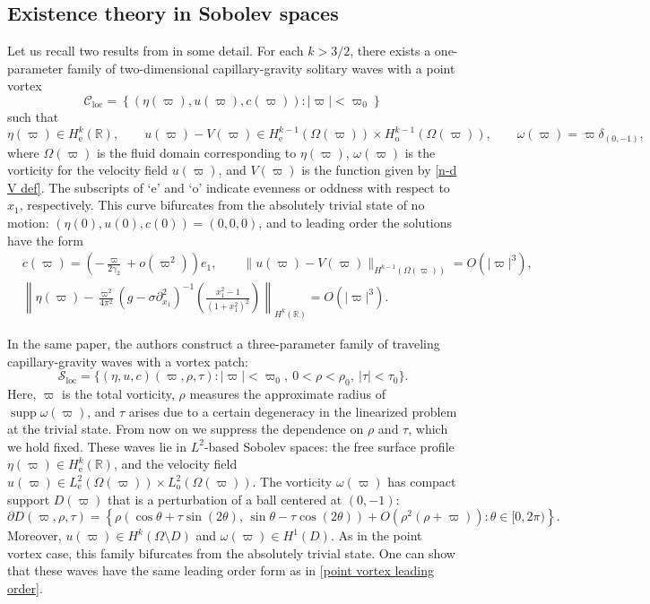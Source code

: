 \documentclass[11pt,reqno]{amsart}
\newcommand{\supp}[1]{\operatorname{supp}{#1}}
\newcommand{\R}{\mathbb{R}}
\theoremstyle{plain}
\theoremstyle{remark}
\numberwithin{equation}{section}
\begin{document}
\subsection{Existence theory in Sobolev spaces}\label{sec sobolev}
Let us recall two results from \cite{shatah2013travelling} in some detail.  For each $k > 3/2$, there exists a one-parameter family of two-dimensional capillary-gravity solitary waves with a point vortex 
\[ \mathscr{C}_{\mathrm{loc}} = \left \{ (\eta(\varpi), u(\varpi), c(\varpi)) : |\varpi| < \varpi_0  \right\} \]
such that 
\[ \eta(\varpi) \in H_{\mathrm{e}}^k(\R),\qquad u(\varpi) - V(\varpi) \in H_{\mathrm{e}}^{k-1}(\Omega(\varpi)) \times H_{\mathrm{o}}^{k-1}(\Omega(\varpi)), \qquad \omega(\varpi) = \varpi \delta_{(0,-1)},\]
where $\Omega(\varpi)$ is the fluid domain corresponding to $\eta(\varpi)$, $\omega(\varpi)$ is the vorticity for the velocity field $u(\varpi)$, and $V(\varpi)$ is the function given by \eqref{n-d V def}.  The subscripts of `e' and `o' indicate evenness or oddness with respect to $x_1$, respectively.  This curve bifurcates from the absolutely trivial state of no motion:  $(\eta(0), u(0), c(0)) = (0,0,0)$,
and to leading order the solutions have the form 
\begin{equation} \label{point vortex leading order}  
  \begin{split} 
    &c(\varpi)  = \left(-\frac{\varpi}{2\gamma_2}  + o(\varpi^2) \right) e_1, \qquad \| u(\varpi) - V(\varpi) \|_{{H}^{k-1}(\Omega(\varpi))}  = O(|\varpi|^3), \\
    & \left\| \eta(\varpi) - \frac{\varpi^2}{4\pi^2} (g-\sigma \partial_{x_1}^2)^{-1} \left( \frac{x_1^2 - 1}{(1+x_1^2)^2} \right) \right\|_{H^k(\R)} = O(|\varpi|^3).   
  \end{split} 
\end{equation} 


In the same paper, the authors construct a three-parameter family of traveling capillary-gravity waves with a vortex patch:
\[ \mathscr{S}_{\mathrm{loc}} = \big\{ (\eta,u,c)(\varpi,\rho,\tau) : |\varpi| < \varpi_0, ~ 0 < \rho <  \rho_0, ~ |\tau| < \tau_0 \big\}.\]
Here, $\varpi$ is the total vorticity, $\rho$ measures the approximate radius of $\supp{\omega(\varpi)}$, and $\tau$ arises due to a certain degeneracy in the linearized problem at the trivial state.   From now on we suppress the dependence on $\rho$ and $\tau$, which we hold fixed. These waves lie in $L^2$-based Sobolev spaces: the free surface profile  $\eta(\varpi) \in H^k_{\mathrm{e}}(\R)$, and the velocity field $u(\varpi) \in L^2_{\mathrm{e}}(\Omega(\varpi)) \times L^2_{\mathrm{o}}(\Omega(\varpi))$.  The vorticity $\omega(\varpi)$ has compact support $D(\varpi)$ that is a perturbation of a ball centered at $(0,-1)$:
 \[ \partial D(\varpi, \rho, \tau) = \left\{ \rho\left( \cos{\theta} + \tau \sin{(2\theta)}, \, \sin{\theta} - \tau \cos{(2\theta)} \right) + O(\rho^2(\rho+\varpi)) : \theta \in [0,2\pi) \right\}.\]
 Moreover, $u(\varpi) \in H^k(\Omega \setminus D)$ and $\omega(\varpi) \in H^1(D)$.  As in the point vortex case, this family bifurcates from the absolutely trivial state. One can show that these waves have the same leading order form as in \eqref{point vortex leading order}.
\end{document}
